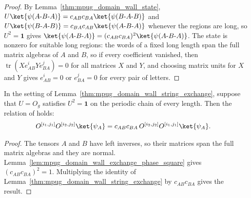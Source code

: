 \begin{proof}\leanok
    By Lemma~\ref{thm:mpug_domain_wall_state},
    $U\ket{\psi(A\text{-}B\text{-}A)}=c_{AB}c_{BA}\ket{\psi(B\text{-}A\text{-}B)}$
    and $U\ket{\psi(B\text{-}A\text{-}B)}=c_{BA}c_{AB}\ket{\psi(A\text{-}B\text{-}A)}$
    whenever the regions are long, so $U^2=\mathbf 1$ gives
    $\ket{\psi(A\text{-}B\text{-}A)}=(c_{AB}c_{BA})^2\ket{\psi(A\text{-}B\text{-}A)}$.
    The state is nonzero for suitable long regions: the words of a fixed
    long length span the full matrix algebras of $A$ and $B$, so if every
    coefficient vanished, then $\operatorname{tr}(Xe_{AB}^iYe_{BA}^j)=0$ for
    all matrices $X$ and $Y$, and choosing matrix units for $X$ and $Y$
    gives $e_{AB}^i=0$ or $e_{BA}^j=0$ for every pair of letters.
\end{proof}

\begin{corollary}
    \label{cor:mpug_domain_wall_string_exchange_printed}
    \leanok
    In the setting of Lemma~\ref{thm:mpug_domain_wall_string_exchange},
    suppose that $U=O_g$ satisfies $U^2=\mathbf 1$ on the periodic chain of
    every length. Then the relation of
    \cite[Section~III.F]{GarreRubioSchuch2024DomainWall} holds:
    \begin{align}
        O^{[i_1,j_1]}O^{[i_2,j_2]}\ket{\psi_A}
         & =c_{AB}c_{BA}\,O^{[i_2,j_2]}O^{[i_1,j_1]}\ket{\psi_A}.
        \notag
    \end{align}
\end{corollary}

\begin{proof}\leanok
    The tensors $A$ and $B$ have left inverses, so their matrices span the
    full matrix algebras and they are normal. Lemma~\ref{lem:mpug_domain_wall_exchange_phase_square}
    gives $(c_{AB}c_{BA})^2=1$. Multiplying the identity of
    Lemma~\ref{thm:mpug_domain_wall_string_exchange} by $c_{AB}c_{BA}$
    gives the result.
\end{proof}

